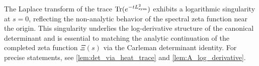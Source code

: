 \begin{remark}
The Laplace transform of the trace \( \operatorname{Tr}(e^{-t L_{\mathrm{sym}}^2}) \) exhibits a logarithmic singularity at \( s = 0 \), reflecting the non-analytic behavior of the spectral zeta function near the origin. This singularity underlies the log-derivative structure of the canonical determinant and is essential to matching the analytic continuation of the completed zeta function \( \Xi(s) \) via the Carleman determinant identity. For precise statements, see \cref{lem:det_via_heat_trace} and \cref{lem:A_log_derivative}.
\end{remark}
